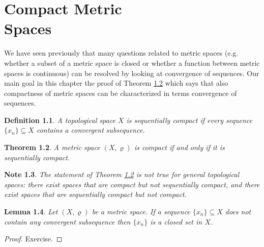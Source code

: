 \documentclass[11pt, letterpaper, oneside]{report}
\theoremstyle{pplain}
\newtheorem{theorem}{Theorem}[chapter]
\newtheorem{lemma}[theorem]{Lemma}
\newtheorem{ITERMVALUE THM}[theorem]{Intermediate Value Theorem}
\newtheorem{HEINEBOREL THM}[theorem]{Heine-Borel Theorem}
\newtheorem{UMETR THM}[theorem]{Urysohn Metrization Theorem}
\newtheorem{UMETR2 THM}[theorem]{Urysohn Metrization Theorem (v.2)}
\theoremstyle{ddefinition}
\newtheorem{definition}[theorem]{Definition}
\newtheorem{note}[theorem]{Note}
\theoremstyle{nnn}
\newtheorem{TDA NN}[theorem]{Topological Data Analysis. }
\theoremstyle{eexercise}
\begin{document}
\newpage


\chapter[Compact Metric Spaces]{Compact Metric \\ Spaces}

\thispagestyle{firststyle}

We have seen previously that many questions related to metric spaces (e.g. whether a
subset of a metric space is closed or whether a function between metric spaces is continuous)
can be resolved by looking at convergence of sequences. 
Our main goal in this chapter 
the proof  of Theorem \ref{COMPACT METRIC THM} which says that also compactness 
of metric spaces can be characterized in terms convergence of sequences. 

\begin{definition}
\label{SEQ COMPACT DEF}
A topological space  $X$ is \emph{sequentially compact} if every sequence 
$\{x_{n}\}\subseteq X$ contains a convergent subsequence. 
\end{definition}

\begin{theorem}
\label{COMPACT METRIC THM}
A metric space $(X, \varrho)$ is compact if and only if it is sequentially compact.
\end{theorem}

\begin{note}
The statement of Theorem \ref{COMPACT METRIC THM} is not true for  general topological spaces:  
there exist  spaces that are compact but not  sequentially compact, and there exist  spaces that 
are sequentially compact but not compact.
\end{note}

\begin{lemma}
\label{NONCONV SUBSEQ CLOSED LEMMA}
Let $(X, \varrho)$ be a metric space. If a sequence $\{x_{n} \}\subseteq X$
does not contain any convergent subsequence then  $\{x_{n}\}$ is a closed set in $X$. 
\end{lemma}

\begin{proof}
Exercise.
\end{proof}
\end{document}
